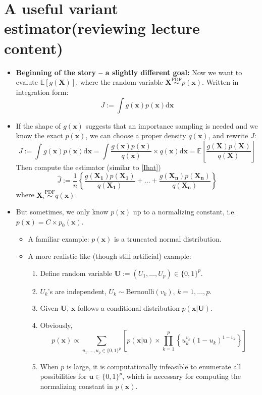 \documentclass[12pt]{article}
\begin{document}
\section{A useful variant estimator(reviewing lecture content)}
\begin{itemize}
	\item {\bf Beginning of the story -- a slightly different goal:} Now we want to evalute $\mathbb{E}[g(\bm{X})]$, where the random variable $\bm{X}\stackrel{\textrm{PDF}}{\sim} p(\bm{x})$.	Written in integration form:
	\begin{equation}
	J := \int g(\bm{x}) p(\bm{x}) \textrm{d}\bm{x}   \label{Goal2}
	\end{equation}
	\item If the shape of $g(\bm{x})$ suggests that an importance sampling is needed and we know the exact $p(\bm{x})$, we can choose a proper density $q(\bm{x})$, and rewrite $J$:
	$$
	J := \int g(\bm{x}) p(\bm{x}) \textrm{d}\bm{x} = \int \frac{g(\bm{x}) p(\bm{x})}{q(\bm{x})} \times q(\bm{x})\textrm{d}\bm{x} = \mathbb{E}\left[ \frac{g(\bm{X}) p(\bm{X})}{q(\bm{X})} \right]
	$$
	Then compute the estimator (similar to \eqref{Ihat})
	\begin{equation}
	\hat{J} := \frac{1}{n}\left\{ \frac{g(\bm{X_1}) p(\bm{X_1})}{q(\bm{X_1})} + \ldots + \frac{g(\bm{X_n}) p(\bm{X_n})}{q(\bm{X_n})} \right\}   \label{Jhat}
	\end{equation}
	where $\bm{X}_i\stackrel{\textrm{PDF}}{\sim}q(\bm{x})$.
	\item But sometimes, we only know $p(\bm{x})$ up to a normalizing constant, i.e. $p(\bm{x}) = C\times p_0(\bm{x})$.
	\begin{itemize}[label=*]
		\item A familiar example: $p(\bm{x})$ is a truncated normal distribution.
		\item A more realistic-like (though still artificial) example:
		\begin{enumerate}
			\item Define random variable $\bm{U}:=(U_1, \ldots, U_p)\in\{0,1\}^p$.
			\item $U_k$'s are independent, $U_k\sim$Bernoulli$(v_k)$, $k=1,\ldots,p$.
			\item Given $\bm{U}$, $\bm{x}$ follows a conditional distribution $p(\bm{x}|\bm{U})$.
			\item Obviously,
			$$
			p(\bm{x}) \propto \sum_{u_1,\ldots,u_p\in\{0,1\}^p} \left[ p(\bm{x}|\bm{u}) \times \prod_{k=1}^p\left\{ u_k^{v_k}(1-u_k)^{1-v_k}\right\} \right]
			$$
			\item When $p$ is large, it is computationally infeasible to enumerate all possibilities for $\bm{u}\in\{0,1\}^p$, which is necessary for computing the normalizing constant in $p(\bm{x})$.

\end{enumerate}
\end{itemize}
\end{itemize}
\end{document}

